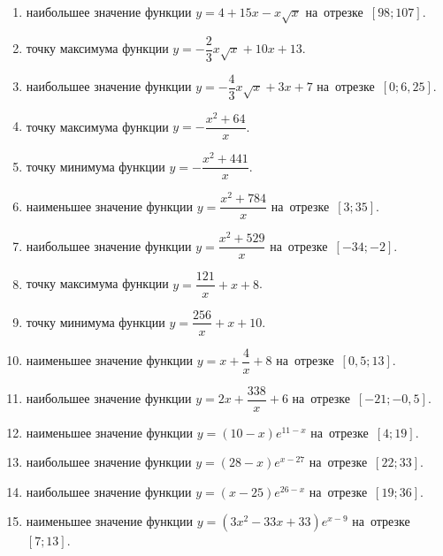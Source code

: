 \documentclass[a4paper,10pt]{article}
\begin{document}
\begin{enumerate}
\item {} наибольшее значение функции $y=4+15x -x\sqrt{x}$ на~отрезке~$\left[98;107\right]$.

\item {} точку максимума функции $y=-\dfrac{2}{3}x\sqrt{x} +10x+13$.

\item {} наибольшее значение функции $y=-\dfrac{4}{3}x\sqrt{x} +3x+7$ на~отрезке~$\left[0;6,25\right]$.

\item {} точку максимума функции $y=-\dfrac{x^2 +64}{x}$.

\item {} точку минимума функции $y=-\dfrac{x^2 +441}{x}$.

\item {} наименьшее значение функции $y=\dfrac{x^2 +784}{x}$ на~отрезке~$\left[3;35\right]$.

\item {} наибольшее значение функции $y=\dfrac{x^2 +529}{x}$ на~отрезке~$\left[-34;-2\right]$.

\item {} точку максимума функции $y=\dfrac{121}{x} +x+8$.

\item {} точку минимума функции $y=\dfrac{256}{x} +x+10$.

\item {} наименьшее значение функции $y=x+\dfrac{4}{x} +8$ на~отрезке~$\left[0,5;13\right]$.

\item {} наибольшее значение функции $y=2x+\dfrac{338}{x} +6$ на~отрезке~$\left[-21;-0,5\right]$.

\item {} наименьшее значение функции $y=\left(10-x\right)e^{11-x}$ на~отрезке~$\left[4;19\right]$.

\item {} наибольшее значение функции $y=\left(28-x\right)e^{x-27}$ на~отрезке~$\left[22;33\right]$.

\item {} наибольшее значение функции $y=\left(x-25\right)e^{26-x}$ на~отрезке~$\left[19;36\right]$.

\item {} наименьшее значение функции $y=\left(3x^2 -33x +33\right)e^{x -9}$ на~отрезке~$\left[7;13\right]$.


\end{enumerate}
\end{document}
